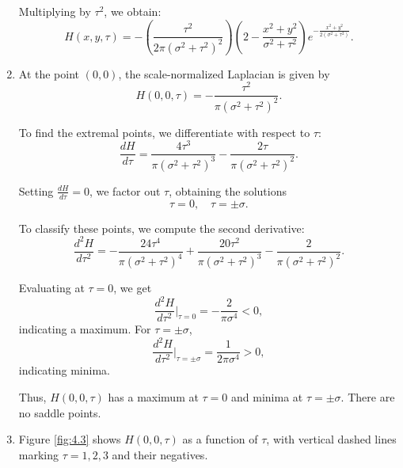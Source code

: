 \documentclass[12pt]{article}
\begin{document}
\begin{enumerate}[label=\roman*., leftmargin=1cm]
\begin{equation}
\end{equation}
Multiplying by \( \tau^2 \), we obtain:
\begin{equation}
    H(x,y,\tau) = - \left( \frac{\tau^2}{2\pi (\sigma^2 + \tau^2)^2} \right) \left(2 - \frac{x^2 + y^2}{\sigma^2 + \tau^2} \right) e^{-\frac{x^2 + y^2}{2(\sigma^2 + \tau^2)}}.
\end{equation}
    \item
    At the point \( (0,0) \), the scale-normalized Laplacian is given by
\begin{equation}
    H(0,0,\tau) = -\frac{\tau^2}{\pi (\sigma^2 + \tau^2)^2}.
\end{equation}

To find the extremal points, we differentiate with respect to \( \tau \):
\begin{equation}
    \frac{dH}{d\tau} = \frac{4\tau^3}{\pi (\sigma^2 + \tau^2)^3} - \frac{2\tau}{\pi (\sigma^2 + \tau^2)^2}.
\end{equation}

Setting \( \frac{dH}{d\tau} = 0 \), we factor out \( \tau \), obtaining the solutions
\begin{equation}
    \tau = 0, \quad \tau = \pm\sigma.
\end{equation}

To classify these points, we compute the second derivative:
\begin{equation}
    \frac{d^2H}{d\tau^2} = -\frac{24\tau^4}{\pi (\sigma^2 + \tau^2)^4} + \frac{20\tau^2}{\pi (\sigma^2 + \tau^2)^3} - \frac{2}{\pi (\sigma^2 + \tau^2)^2}.
\end{equation}

Evaluating at \( \tau = 0 \), we get
\begin{equation}
    \frac{d^2H}{d\tau^2} \Big|_{\tau=0} = -\frac{2}{\pi \sigma^4} < 0,
\end{equation}
indicating a maximum. For \( \tau = \pm\sigma \),
\begin{equation}
    \frac{d^2H}{d\tau^2} \Big|_{\tau = \pm \sigma} = \frac{1}{2\pi \sigma^4} > 0,
\end{equation}
indicating minima.

Thus, \( H(0,0,\tau) \) has a maximum at \( \tau = 0 \) and minima at \( \tau = \pm\sigma \). There are no saddle points.

    \item
Figure \ref{fig:4.3} shows \( H(0,0,\tau) \) as a function of \( \tau \), with vertical dashed lines marking \( \tau = 1,2,3 \) and their negatives.


\end{enumerate}
\end{document}
